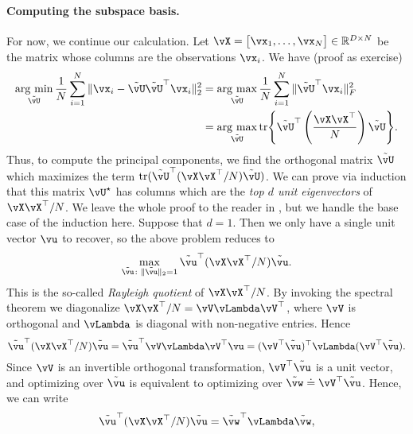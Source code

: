 \documentclass[../../book-main.tex]{subfiles}
\begin{document}
\paragraph{Computing the subspace basis.}
For now, we continue our calculation. Let \(\vX = \mat{\vx_{1}, \dots, \vx_{N}} \in \R^{D \times N}\) be the matrix whose columns are the observations \(\vx_{i}\). We have (proof as exercise)
\begin{align}
    \argmin_{\tilde{\vU}}\frac{1}{N}\sum_{i = 1}^{N}\norm{\vx_{i} - \tilde{\vU}\tilde{\vU}^{\top}\vx_{i}}_{2}^{2}
    &= \argmax_{\tilde{\vU}}\frac{1}{N}\sum_{i = 1}^{N}\norm{\tilde{\vU}^{\top}\vx_{i}}_{F}^{2} \\ 
    &= \argmax_{\tilde{\vU}}\tr\rc{\tilde{\vU}^{\top}\bp{\frac{\vX\vX^{\top}}{N}}\tilde{\vU}}.
\end{align}
Thus, to compute the principal components, we find the orthogonal matrix
\(\tilde{\vU}\) which maximizes the term
\(\tr(\tilde{\vU}^{\top}(\vX\vX^{\top}/N)\tilde{\vU})\). We can prove via
induction that this matrix \(\vU^{\star}\) has columns which are the \textit{top \(d\) unit eigenvectors} of \(\vX\vX^{\top}/N\). We leave the whole proof to the reader in , but we handle the base case of the induction here. Suppose that \(d = 1\). Then we only have a single unit vector \(\vu\) to recover, so the above problem reduces to
\begin{equation}
    \max_{\tilde{\vu} \colon \norm{\tilde{\vu}}_{2} = 1} \tilde{\vu}^{\top}(\vX\vX^{\top}/N)\tilde{\vu}.
\end{equation}
This is the so-called \textit{Rayleigh quotient} of \(\vX\vX^{\top}/N\). By invoking the spectral theorem we diagonalize \(\vX\vX^{\top}/N = \vV\vLambda\vV^{\top}\), where \(\vV\) is orthogonal and \(\vLambda\) is diagonal with non-negative entries. Hence 
\begin{equation}
    \tilde{\vu}^{\top}(\vX\vX^{\top}/N)\tilde{\vu} = \tilde{\vu}^{\top}\vV\vLambda\vV^{\top}\vu = (\vV^{\top}\tilde{\vu})^{\top}\vLambda(\vV^{\top}\tilde{\vu}).
\end{equation}
Since \(\vV\) is an invertible orthogonal transformation, \(\vV^{\top}\tilde{\vu}\) is a unit vector, and optimizing over \(\tilde{\vu}\) is equivalent to optimizing over \(\tilde{\vw} \doteq \vV^{\top}\tilde{\vu}\). Hence, we can write
\begin{equation}
    \tilde{\vu}^{\top}(\vX\vX^{\top}/N)\tilde{\vu} = \tilde{\vw}^{\top}\vLambda\tilde{\vw},
\end{equation}
\end{document}
